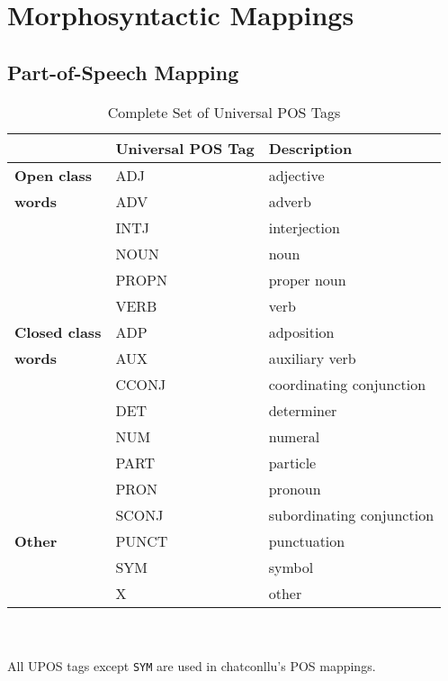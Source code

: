  
\chapter{Morphosyntactic Mappings}
\label{appendixa}

\section{Part-of-Speech Mapping}

\begin{table}[h!]
\caption {Complete Set of Universal POS Tags} \label{tab:uposset}
\begin{tabularx}{\linewidth}{@{}llX@{}}
\toprule
 & \textbf{Universal POS Tag} & \textbf{Description}\\ \midrule
\textbf{Open class} & ADJ & adjective\\
\textbf{words} & ADV & adverb\\
 & INTJ & interjection\\
 & NOUN & noun\\
 & PROPN & proper noun\\
 & VERB & verb\\\addlinespace
\textbf{Closed class} & ADP & adposition\\
\textbf{words} & AUX & auxiliary verb\\
 & CCONJ & coordinating conjunction\\
 & DET & determiner\\
 & NUM & numeral\\
 & PART & particle\\
 & PRON & pronoun\\
 & SCONJ & subordinating conjunction\\\addlinespace
\textbf{Other} & PUNCT & punctuation\\
 & SYM & symbol\\
 & X & other\\\bottomrule
\end{tabularx}\\
\vspace{0.5cm}\\
All UPOS tags except \texttt{SYM} are used in chatconllu's POS mappings.\\
\end{table}

